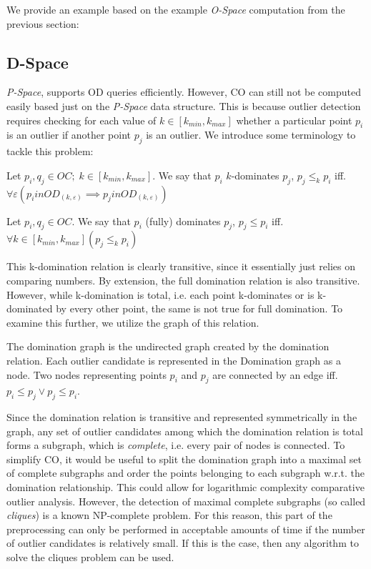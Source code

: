 \documentclass[runningheads]{llncs}
\begin{document}
We provide an example based on the example \emph{O-Space} computation from the previous section:
\subsection{D-Space}
\emph{P-Space}, supports OD queries efficiently. However, CO can still not be computed easily based just on the \emph{P-Space} data structure. This is because outlier detection requires checking for each value of $k \in [k_{min},k_{max}]$ whether a particular point $p_i$ is an outlier if another point $p_j$ is an outlier. We introduce some terminology to tackle this problem:
\begin{definition}[k-domination]
Let $p_i,q_j \in OC;\; k\in [k_{min},k_{max}]$. We say that $p_i$ $k$-dominates $p_j$, $p_j \leq_{k} p_i$ iff. $\forall\varepsilon(p_i in OD_{(k,\varepsilon)} \implies p_j in OD_{(k,\varepsilon)})$
\end{definition}
\begin{definition}
Let $p_i,q_j \in OC$. We say that $p_i$ (fully) dominates $p_j$, $p_j \leq p_i$ iff. $\forall k\in [k_{min},k_{max}](p_j \leq_k p_i)$
\end{definition}
This k-domination relation is clearly transitive, since it essentially just relies on comparing numbers. By extension, the full domination relation is also transitive. However, while k-domination is total, i.e. each point k-dominates or is k-dominated by every other point, the same is not true for full domination. To examine this further, we utilize the graph of this relation.
\begin{definition}
The domination graph is the undirected graph created by the domination relation. Each outlier candidate is represented in the Domination graph as a node. Two nodes representing points $p_i$ and $p_j$ are connected by an edge iff. $p_i \leq p_j \vee p_j \leq p_i$.
\end{definition}

Since the domination relation is transitive and represented symmetrically in the graph, any set of outlier candidates among which the domination relation is total forms a subgraph, which is \emph{complete}, i.e. every pair of nodes is connected. To simplify CO, it would be useful to split the domination graph into a maximal set of complete subgraphs and order the points belonging to each subgraph w.r.t. the domination relationship. This could allow for logarithmic complexity comparative outlier analysis. However, the detection of maximal complete subgraphs (so called \emph{cliques}) is a known NP-complete problem. For this reason, this part of the preprocessing can only be performed in acceptable amounts of time if the number of outlier candidates is relatively small. If this is the case, then any algorithm to solve the cliques problem can be used.
\end{document}
